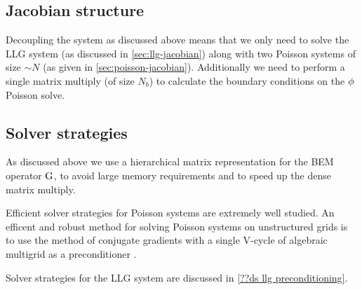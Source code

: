 \subsection{Jacobian structure}
\label{sec:semi-implicit-bem-jacobian-structure}

Decoupling the system as discussed above means that we only need to solve the LLG system (as discussed in \cref{sec:llg-jacobian}) along with two Poisson systems of size $\sim N$ (as given in \cref{sec:poisson-jacobian}).
Additionally we need to perform a single matrix multiply (of size $N_b$) to calculate the boundary conditions on the $\phi$ Poisson solve.


\subsection{Solver strategies}
\label{sec:semi-implicit-bem-solver-strategies}

As discussed above we use a hierarchical matrix representation for the BEM operator ${\mathbf{\mathrm{G}}}$, to avoid large memory requirements and to speed up the dense matrix multiply.

Efficient solver strategies for Poisson systems are extremely well studied.
An efficent and robust method for solving Poisson systems on unstructured grids is to use the method of conjugate gradients with a single V-cycle of algebraic multigrid as a preconditioner \cite[Chap. 2]{HowardElmanDavidSilvester2006}.

Solver strategies for the LLG system are discussed in \cref{??ds llg preconditioning}.

